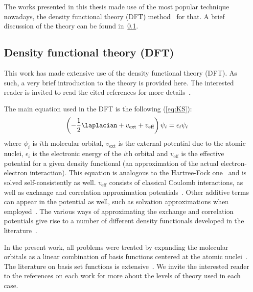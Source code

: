 The works presented in this thesis made use of the most popular technique nowadays,
the density functional theory (DFT)
method~\cite{Hohenberg_1964,Kohn_1965,Perdew_2014,Kryachko_2014,Yu_2016} for
that.
A brief discussion of the theory can be found in~\cref{sec:dft}.

\subsection{Density functional theory (DFT)}\label{sec:dft}

This work has made extensive use of the density functional theory (DFT).
As such, a very brief introduction to the theory is provided here.
The interested reader is invited to read the cited references for more
details~\cite{Hohenberg_1964,Kohn_1965}.

The main equation used in the DFT is the following (\cref{eq:KS}):
%
\begin{equation}
	\left(-\frac{1}{2} \laplacian
	+ v_\text{ext}
	+ v_\text{eff}
	\right) \psi_i
	= \epsilon_i \psi_i
	\label{eq:KS}
\end{equation}
%
where $\psi_i$ is $i$th molecular orbital, $v_\text{ext}$ is the external
potential due to the atomic nuclei, $\epsilon_i$ is the electronic energy
of the $i$th orbital and $v_\text{eff}$ is the effective potential for a given
density functional (an approximation of the actual electron-electron
interaction).
This equation is analogous to the Hartree-Fock one~\cite{Szabo_1996}
and is solved self-consistently as well.
$v_\text{eff}$ consists of classical Coulomb interactions, as well as exchange
and correlation approximation
potentials~\cite{Perdew_2014,Kryachko_2014,Yu_2016}.
Other additive terms can appear in the potential as well, such as solvation
approximations when employed~\cite{Marenich_2009,Marenich_2012}.
The various ways of approximating the exchange and correlation potentials give
rise to a number of different density functionals developed in the
literature~\cite{Chai_2008a,Chai_2008b,Goerigk_2011,Arago_2011,Salzner_2011,Burns_2011,Minenkov_2012,DFT2016_poll}.

In the present work, all problems were treated by expanding the molecular
orbitals as a linear combination of basis functions centered at the atomic
nuclei~\cite{Szabo_1996,Helgaker_1997,Jensen_2012,Hill_2012}.
The literature on basis set functions is extensive~\cite{Ditchfield_1971,Hehre_1972,Hariharan_1973,Hariharan_1974,Gordon_1980,Francl_1982,Clark_1983,Frisch_1984,Binning_1990,Blaudeau_1997,Rassolov_1998,Rassolov_2001}.
We invite the interested reader to the references on each work for more about
the levels of theory used in each case.

